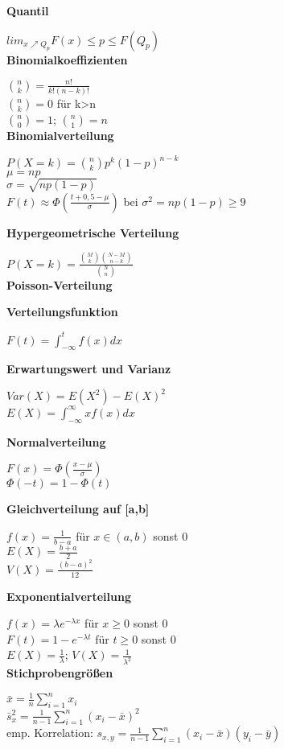 \documentclass[10pt,twocolumn,a4paper]{article}
\begin{document}
\begin{flushleft}
\textbf{Quantil}

$lim_{x\nearrow Q_p}F(x) \leq p \leq F(Q_p)$\\

\textbf{Binomialkoeffizienten}

$\binom{n}{k} = \frac{n!}{k!(n-k)!}$\\
$\binom{n}{k} = 0$ für k>n\\
$\binom{n}{0} = 1$; $\binom{n}{1} = n$\\

\textbf{Binomialverteilung}

$P(X=k) = \binom{n}{k}p^k(1-p)^{n-k}$\\
$\mu = np$\\
$\sigma = \sqrt{np(1-p)}$\\
$F(t) \approx \Phi(\frac{t+0,5-\mu}{\sigma})$ bei $\sigma^2 = np(1-p) \geq 9$

\textbf{Hypergeometrische Verteilung}

$P(X=k) = \frac{\binom{M}{k}\binom{N-M}{n-k}}{\binom{N}{n}}$\\

\textbf{Poisson-Verteilung}

\textbf{Verteilungsfunktion}

$F(t) = \int_{-\infty}^t f(x) dx$

\textbf{Erwartungswert und Varianz}

$Var(X) = E(X^2) - E(X)^2$\\
$E(X) = \int_{-\infty}^{\infty} xf(x) dx$

\textbf{Normalverteilung}

$F(x) = \Phi(\frac{x-\mu}{\sigma})$\\
$\Phi(-t) = 1-\Phi(t)$

\textbf{Gleichverteilung auf [a,b]}

$f(x) = \frac{1}{b-a}$ für $x \in (a,b)$ sonst 0\\
$E(X) = \frac{b+a}{2}$\\
$V(X) = \frac{(b-a)^2}{12}$

\textbf{Exponentialverteilung}

$f(x) = \lambda e^{-\lambda x}$ für $x \geq 0$ sonst 0\\
$F(t) = 1-e^{-\lambda t}$ für $t \geq 0$ sonst 0\\
$E(X) = \frac{1}{\lambda}$; $V(X) = \frac{1}{\lambda^2}$\\

\textbf{Stichprobengrößen}

$\bar{x} = \frac{1}{n} \sum_{i=1}^{n}x_i$\\
$\bar{s}_x^2 = \frac{1}{n-1} \sum_{i=1}^{n}(x_i-\bar{x})^2$\\
emp. Korrelation: $s_{x,y} = \frac{1}{n-1} \sum_{i=1}^{n}(x_i-\bar{x})(y_i-\bar{y})$\\


\end{flushleft}
\end{document}
